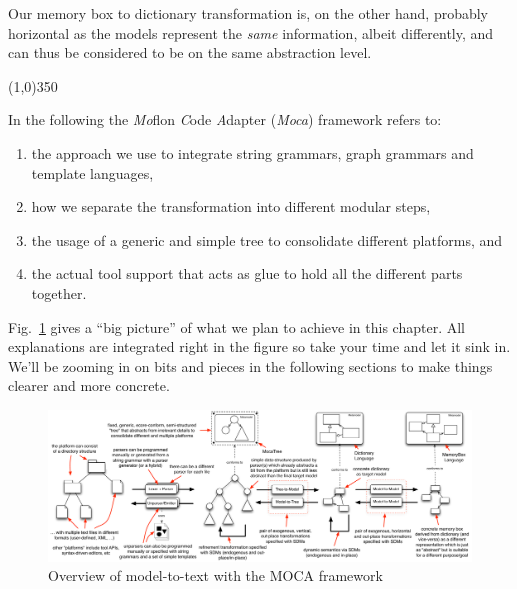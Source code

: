 Our memory box to dictionary transformation is, on the other hand, probably horizontal as the models represent the \emph{same} information, albeit differently, and can thus be considered to be on the same abstraction level.

\vspace{1cm}
\line(1,0){350}
\vspace{1cm}

In the following the \emph{Mo}flon \emph{C}ode \emph{A}dapter (\emph{Moca}) framework refers to:
\begin{enumerate}
 \item the approach we use to integrate string grammars, graph grammars and template languages, 
 \item how we separate the transformation into different modular steps, 
 \item the usage of a generic and simple tree to consolidate different platforms, and 
 \item the actual tool support that acts as glue to hold all the different parts together.
\end{enumerate}
 
Fig.~\ref{fig:moca-overview} gives a ``big picture'' of what we plan to achieve in this chapter.
All explanations are integrated right in the figure so take your time and let it sink in.
We'll be zooming in on bits and pieces in the following sections to make things clearer and more concrete.
\begin{figure}[htp]
\begin{center}
 \includegraphics[angle=90, height=\textheight]{pics/moca/text-to-model}
  \caption{Overview of model-to-text with the MOCA framework}
  \label{fig:moca-overview}
\end{center}
\end{figure} 

\clearpage



 
 


%

%
 

